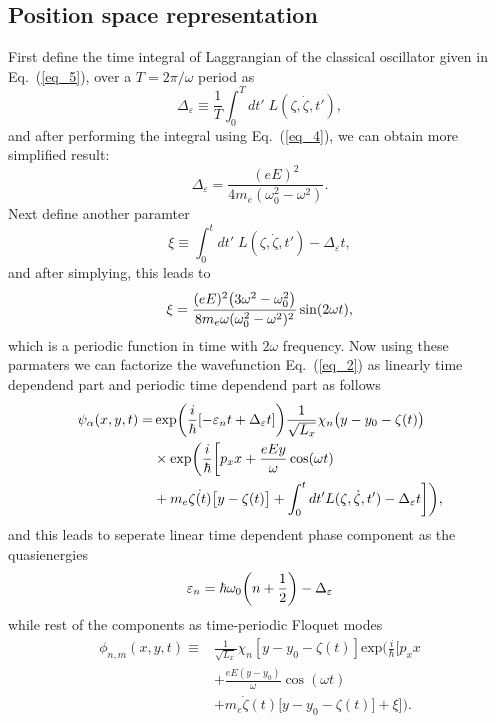 \subsection{Position space representation}

First define the time integral of Laggrangian of the classical oscillator given in Eq.~(\ref{eq_5}), over a $T=2\pi/\omega$ period as
\begin{equation} \label{eq_b1}
  \Delta_{\varepsilon} \equiv \frac{1}{T} \int_0^T dt' \; L(\zeta,\dot{\zeta},t'),
\end{equation}
and after performing the integral using Eq.~(\ref{eq_4}), we can obtain more simplified result:
\begin{equation} \label{eq_b2}
  \Delta_{\varepsilon} = \frac{(eE)^2}{4m_e(\omega_0^2 - \omega^2)}.
\end{equation}
Next define another paramter
\begin{equation} \label{eq_b3}
  \xi \equiv
  \int_0^t dt' \; L(\zeta,\dot{\zeta},t') -
  \Delta_{\varepsilon} t,
\end{equation}
and after simplying, this leads to
\begin{equation} \label{eq_b4}
  \xi =
  \frac{(eE)^2\qty(3\omega^2 - \omega_0^2)}{8m_e\omega(\omega_0^2 - \omega^2)^2} \sin(2\omega t),
\end{equation}
which is a periodic function in time with $2\omega$ frequency. Now using these  parmaters we can factorize the wavefunction Eq.~(\ref{eq_2}) as linearly time dependend part and periodic time dependend part as follows
\begin{equation} \label{eq_b5}
  \begin{aligned}
    \psi_{\alpha}(x,y,t)  = &
    \exp(\frac{i}{\hbar}\qty[-\varepsilon_nt + \Delta_{\varepsilon} t ])
    \frac{1}{\sqrt{L_x}} \chi_n\big(y - y_0 - \zeta(t)\big)
    \\
    & \times
    \text{exp}\bigg(
     \frac{i}{\hbar}\bigg[
     p_x x +
     \frac{eEy}{\omega}\cos(\omega t) \\
     & +
     m_e\dot{\zeta(t)}\big[y-\zeta(t)\big]
     + \int_0^{t}dt'L(\zeta,\dot{\zeta},t') - \Delta_{\varepsilon} t  \bigg]
     \bigg),
  \end{aligned}
\end{equation}
and this leads to seperate linear time dependent phase component as the quasienergies
\begin{equation} \label{eq_b6}
  \varepsilon_{n} =
  \hbar \omega_0\qty(n + \frac{1}{2}) - \Delta_{\varepsilon}
\end{equation}
while rest of the components as time-periodic Floquet modes
\begin{equation} \label{eq_b7}
  \begin{aligned}
    \phi_{n,m}(x,y,t) \equiv &
    \frac{1}{\sqrt{L_x}} \chi_{n}\left[y - y_0 - \zeta(t)\right]
    \text{exp}\bigg(
     \frac{i}{\hbar}\bigg[
     p_x x \\
     & +
     \frac{eE(y - y_0)}{\omega}\cos(\omega t) \\
     & +
     m_e\dot{\zeta}(t)\big[y - y_0 -\zeta(t)\big]
     + \xi \bigg]\bigg).
  \end{aligned}
\end{equation}

